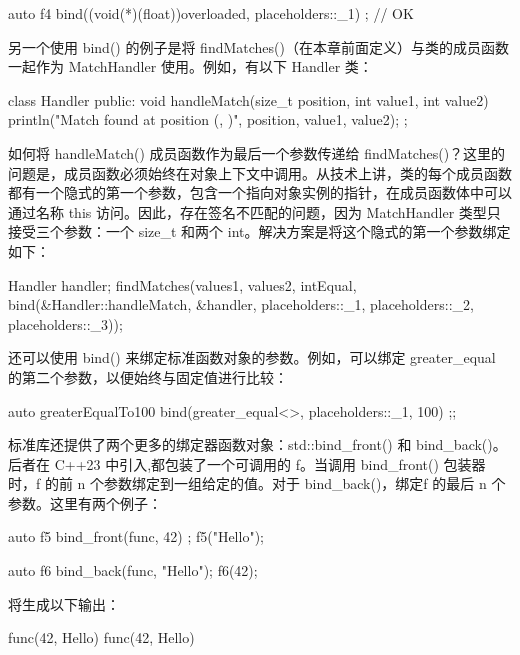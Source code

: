 \begin{cpp}
auto f4 { bind((void(*)(float))overloaded, placeholders::_1) }; // OK
\end{cpp}

另一个使用 bind() 的例子是将 findMatches()（在本章前面定义）与类的成员函数一起作为 MatchHandler 使用。例如，有以下 Handler 类：

\begin{cpp}
class Handler
{
    public:
        void handleMatch(size_t position, int value1, int value2)
        {
            println("Match found at position {} ({}, {})",
                position, value1, value2);
        }
};
\end{cpp}

如何将 handleMatch() 成员函数作为最后一个参数传递给 findMatches()？这里的问题是，成员函数必须始终在对象上下文中调用。从技术上讲，类的每个成员函数都有一个隐式的第一个参数，包含一个指向对象实例的指针，在成员函数体中可以通过名称 this 访问。因此，存在签名不匹配的问题，因为 MatchHandler 类型只接受三个参数：一个 size\_t 和两个 int。解决方案是将这个隐式的第一个参数绑定如下：

\begin{cpp}
Handler handler;
findMatches(values1, values2, intEqual, bind(&Handler::handleMatch, &handler,
            placeholders::_1, placeholders::_2, placeholders::_3));
\end{cpp}

还可以使用 bind() 来绑定标准函数对象的参数。例如，可以绑定 greater\_equal 的第二个参数，以便始终与固定值进行比较：

\begin{cpp}
auto greaterEqualTo100 { bind(greater_equal<>{}, placeholders::_1, 100) };;
\end{cpp}

标准库还提供了两个更多的绑定器函数对象：std::bind\_front() 和 bind\_back()。后者在 C++23 中引入,都包装了一个可调用的 f。当调用 bind\_front() 包装器时，f 的前 n 个参数绑定到一组给定的值。对于 bind\_back()，绑定f 的最后 n 个参数。这里有两个例子：

\begin{cpp}
auto f5 { bind_front(func, 42) };
f5("Hello");

auto f6 { bind_back(func, "Hello")};
f6(42);
\end{cpp}

将生成以下输出：

\begin{shell}
func(42, Hello)
func(42, Hello)
\end{shell}

